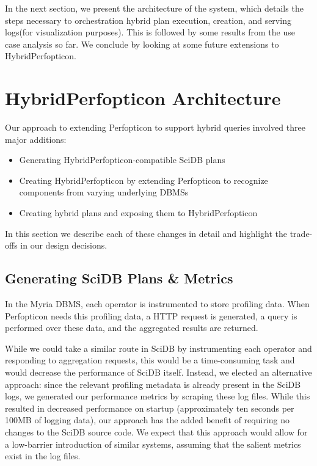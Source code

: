 \documentclass{chi2009}
\begin{document}
In the next section, we present the architecture of the system, which details the steps necessary to orchestration hybrid plan execution, creation, and serving logs(for visualization purposes). This is followed by some results from the use case analysis so far. We conclude by looking at some future extensions to HybridPerfopticon.


\section{HybridPerfopticon Architecture}

Our approach to extending Perfopticon to support hybrid queries involved three major additions:

\begin{itemize}
\item Generating HybridPerfopticon-compatible SciDB plans
\item Creating HybridPerfopticon by extending Perfopticon to recognize components from varying underlying DBMSs
\item Creating hybrid plans and exposing them to HybridPerfopticon
\end{itemize}

In this section we describe each of these changes in detail and highlight the trade-offs in our design decisions.

\subsection{Generating SciDB Plans \& Metrics}

In the Myria DBMS, each operator is instrumented to store profiling data.  When Perfopticon needs this profiling data, a HTTP request is generated, a query is performed over these data, and the aggregated results are returned.  

While we could take a similar route in SciDB by instrumenting each operator and responding to aggregation requests, this would be a time-consuming task and would decrease the performance of SciDB itself.  Instead, we elected an alternative approach: since the relevant profiling metadata is already present in the SciDB logs, we generated our performance metrics by scraping these log files.  While this resulted in decreased performance on startup (approximately ten seconds per 100MB of logging data), our approach has the added benefit of requiring no changes to the SciDB source code.  We expect that this approach would allow for a low-barrier introduction of similar systems, assuming that the salient metrics exist in the log files.
\end{document}
